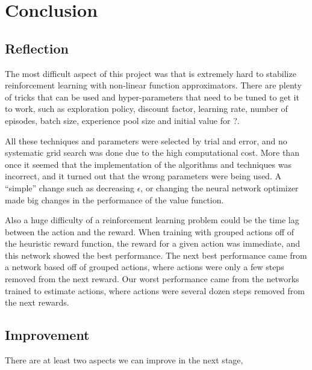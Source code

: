 \documentclass[a4paper]{article}
\begin{document}


\section{Conclusion}

\subsection{Reflection}

The most difficult aspect of this project was that is extremely hard to stabilize reinforcement learning with non-linear function approximators. There are plenty of tricks that can be used and hyper-parameters that need to be tuned to get it to work, such as exploration policy, discount factor, learning rate, number of episodes, batch size, experience pool size  and initial value for ?.

All these techniques and parameters were selected by trial and error, and no systematic grid search was done due to the high computational cost. More than once it seemed that the implementation of the algorithms and techniques was incorrect, and it turned out that the wrong parameters were being used. A ``simple'' change such as decreasing $\epsilon$, or changing the neural network optimizer made big changes in the performance of the value function.

Also a huge difficulty of a reinforcement learning problem could be the time lag between the action and the reward. When training with grouped actions off of the heuristic reward function, the reward for a given action was immediate, and this network showed the best performance. The next best performance came from a network based off of grouped actions, where actions were only a few steps removed from the next reward. Our worst performance came from the networks trained to estimate actions, where actions were several dozen steps removed from the next rewards.

\subsection{Improvement}
There are at least two aspects we can improve in the next stage,
\end{document}
